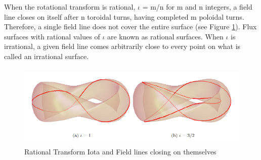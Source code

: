 When the rotational transform is rational, $\iota$ = m/n for m and n integers, a field line closes on itself after n toroidal turns, having completed m poloidal turns. Therefore, a single field line does not cover the entire surface (see Figure \ref{rational-iota}). Flux surfaces with rational values of $\iota$ are known as rational surfaces. When $\iota$ is irrational, a given field line comes arbitrarily close to every point on what is called an irrational surface.
\begin{figure}[H]
    \centering
    \includegraphics[height=4cm]{figures/rational-iota.png}
    \caption{Rational Transform Iota and Field lines closing on themselves \cite{imbert-gerard_introduction_nodate}}
    \label{rational-iota}
\end{figure}